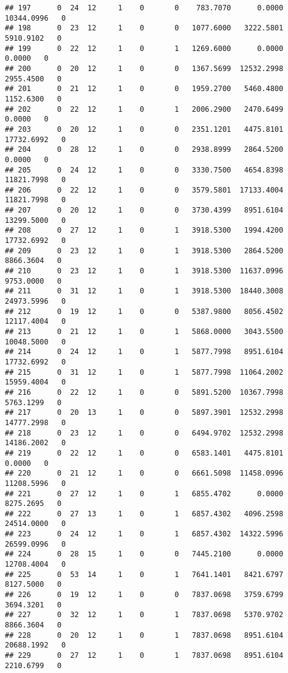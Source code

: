 \documentclass[
]{article}
\begin{document}
\begin{enumerate}
\begin{verbatim}
## 197      0  24  12     1    0       0    783.7070      0.0000  10344.0996   0
## 198      0  23  12     1    0       0   1077.6000   3222.5801   5910.9102   0
## 199      0  22  12     1    0       1   1269.6000      0.0000      0.0000   0
## 200      0  20  12     1    0       0   1367.5699  12532.2998   2955.4500   0
## 201      0  21  12     1    0       0   1959.2700   5460.4800   1152.6300   0
## 202      0  22  12     1    0       1   2006.2900   2470.6499      0.0000   0
## 203      0  20  12     1    0       0   2351.1201   4475.8101  17732.6992   0
## 204      0  28  12     1    0       0   2938.8999   2864.5200      0.0000   0
## 205      0  24  12     1    0       0   3330.7500   4654.8398  11821.7998   0
## 206      0  22  12     1    0       0   3579.5801  17133.4004  11821.7998   0
## 207      0  20  12     1    0       0   3730.4399   8951.6104  13299.5000   0
## 208      0  27  12     1    0       1   3918.5300   1994.4200  17732.6992   0
## 209      0  23  12     1    0       1   3918.5300   2864.5200   8866.3604   0
## 210      0  23  12     1    0       1   3918.5300  11637.0996   9753.0000   0
## 211      0  31  12     1    0       1   3918.5300  18440.3008  24973.5996   0
## 212      0  19  12     1    0       0   5387.9800   8056.4502  12117.4004   0
## 213      0  21  12     1    0       1   5868.0000   3043.5500  10048.5000   0
## 214      0  24  12     1    0       1   5877.7998   8951.6104  17732.6992   0
## 215      0  31  12     1    0       1   5877.7998  11064.2002  15959.4004   0
## 216      0  22  12     1    0       0   5891.5200  10367.7998   5763.1299   0
## 217      0  20  13     1    0       0   5897.3901  12532.2998  14777.2998   0
## 218      0  23  12     1    0       0   6494.9702  12532.2998  14186.2002   0
## 219      0  22  12     1    0       0   6583.1401   4475.8101      0.0000   0
## 220      0  21  12     1    0       0   6661.5098  11458.0996  11208.5996   0
## 221      0  27  12     1    0       1   6855.4702      0.0000   8275.2695   0
## 222      0  27  13     1    0       1   6857.4302   4096.2598  24514.0000   0
## 223      0  24  12     1    0       1   6857.4302  14322.5996  26599.0996   0
## 224      0  28  15     1    0       0   7445.2100      0.0000  12708.4004   0
## 225      0  53  14     1    0       1   7641.1401   8421.6797   8127.5000   0
## 226      0  19  12     1    0       0   7837.0698   3759.6799   3694.3201   0
## 227      0  32  12     1    0       1   7837.0698   5370.9702   8866.3604   0
## 228      0  20  12     1    0       1   7837.0698   8951.6104  20688.1992   0
## 229      0  27  12     1    0       1   7837.0698   8951.6104   2210.6799   0

\end{verbatim}
\end{enumerate}
\end{document}
